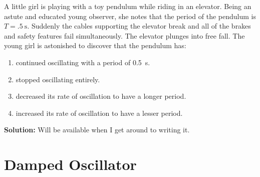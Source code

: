 \begin{example}
  A little girl is playing with a toy pendulum while riding in an elevator.
  Being an astute and educated young observer, she notes that the period of the
  pendulum is $T=\SI{.5}\second$. Suddenly the cables supporting the elevator
  break and all of the brakes and safety features fail simultaneously. The
  elevator plunges into free fall. The young girl is astonished to discover
  that the pendulum has:
  \begin{enumerate}[nosep]
  \item continued oscillating with a period of \SI{.5}\second.
  \item stopped oscillating entirely.
  \item decreased its rate of oscillation to have a longer period.
  \item increased its rate of oscillation to have a lesser period.
  \end{enumerate}

  \textbf{Solution:} Will be available when I get around to writing it.
\end{example}







\section{Damped Oscillator}

